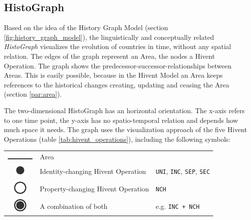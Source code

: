 
\subsection{HistoGraph} %
\label{sub:histograph}

Based on the idea of the History Graph Model (section \ref{fig:history_graph_model}), the linguistically and conceptually related \emph{HistoGraph} visualizes the evolution of countries in time, without any spatial relation. The edges of the graph represent an Area, the nodes a Hivent Operation. The graph shows the predecessor-successor-relationships between Areas. This is easily possible, because in the Hivent Model an Area keeps references to the historical changes creating, updating and ceasing the Area (section \ref{par:area}).

The two-dimensional HistoGraph has an horizontal orientation. The x-axis refers to one time point, the y-axis has no spatio-temporal relation and depends how much space it needs. The graph uses the visualization approach of the five Hivent Operations (table \ref{tab:hivent_operations}), including the following symbols:

\begin{table}[H]
\begin{center}
\begin{tabular}{c l l}

  \raisebox{3.5\height}
  {\includegraphics{graphics/development/histograph/line}}
  & Area
  & \\

  \raisebox{-0.2\height}
  {\includegraphics{graphics/development/histograph/circle_filled}}
  & Identity-changing Hivent Operation
  & \texttt{UNI}, \texttt{INC}, \texttt{SEP}, \texttt{SEC} \\

  \raisebox{-0.2\height}
  {\includegraphics{graphics/development/histograph/circle_unfilled}}
  & Property-changing Hivent Operation
  & \texttt{NCH} \\

  \raisebox{-0.2\height}
  {\includegraphics{graphics/development/histograph/circle_combo}}
  & A combination of both
  & e.g. \texttt{INC + NCH}

\end{tabular}
\label{tab:histograph_symbols}
\end{center}
\end{table}

